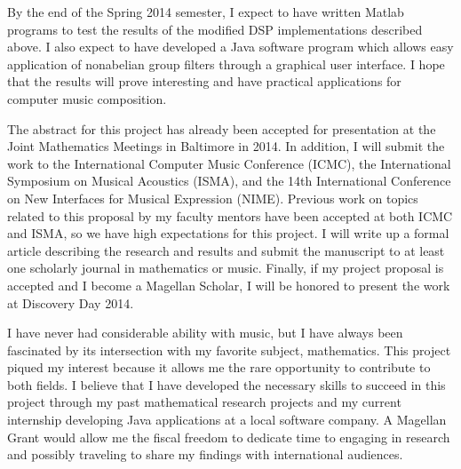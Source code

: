 \documentclass[10pt]{article}
\begin{document}
\vskip5mm

By the end of the Spring 2014 semester, I expect to have written Matlab programs
to test the results of the modified DSP implementations described above.  I also
expect to have developed a Java software program which allows easy application
of nonabelian group filters through a graphical user interface.  I hope that the
results will prove interesting and have practical applications for computer
music composition.  

The abstract for this project has already been accepted for presentation at the
Joint Mathematics Meetings in Baltimore in 2014.  In addition, I will submit the
work to the International Computer Music Conference (ICMC), the International
Symposium on Musical Acoustics (ISMA), and the 14th International
Conference on New Interfaces for Musical Expression (NIME). Previous work on
topics related to this proposal by my faculty mentors have been accepted at both
ICMC and ISMA,
 so we have high expectations for this project. I will write up a formal article 
describing the research and results and submit the manuscript to at least
one scholarly journal in mathematics or music. Finally, if my project proposal
is accepted and I become a Magellan Scholar, I will be honored to present the
work at Discovery Day 2014.   

\vskip5mm

I have never had considerable ability with music, but I have always been
fascinated by its intersection with my favorite subject, mathematics.  This
project piqued my interest because it allows me the rare opportunity to
contribute to both fields.  I believe that I have developed the necessary skills
to succeed in this project through my past mathematical research projects and my
current internship developing Java applications at a local software company.  A
Magellan Grant would allow me the fiscal freedom to dedicate time to engaging in
research and possibly traveling to share my findings with international
audiences.  
\end{document}
